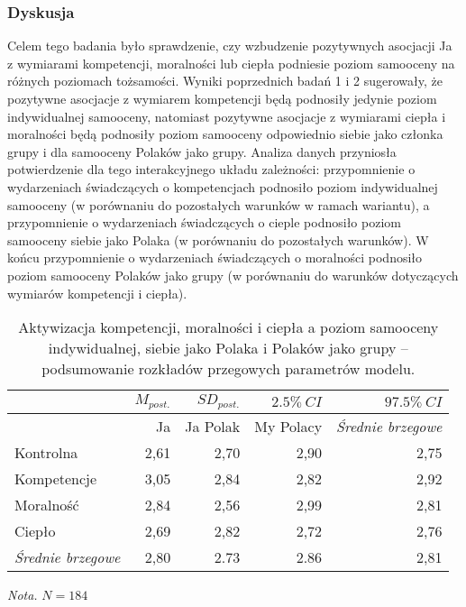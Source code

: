 \documentclass[man]{apa6}
\begin{document}
\subsubsection{Dyskusja}
Celem tego badania było sprawdzenie, czy wzbudzenie pozytywnych asocjacji Ja z wymiarami kompetencji, moralności lub ciepła podniesie poziom samooceny na różnych poziomach tożsamości. Wyniki poprzednich badań 1 i 2 sugerowały, że pozytywne asocjacje z wymiarem kompetencji będą podnosiły jedynie poziom indywidualnej samooceny, natomiast pozytywne asocjacje z wymiarami ciepła i moralności będą podnosiły poziom samooceny odpowiednio siebie jako członka grupy i dla samooceny Polaków jako grupy. Analiza danych przyniosła potwierdzenie dla tego interakcyjnego układu zależności: przypomnienie o wydarzeniach świadczących o kompetencjach podnosiło poziom indywidualnej samooceny (w porównaniu do pozostałych warunków w ramach wariantu), a przypomnienie o wydarzeniach świadczących o cieple podnosiło poziom samooceny siebie jako Polaka (w porównaniu do pozostałych warunków). W końcu przypomnienie o wydarzeniach świadczących o moralności podnosiło poziom samooceny Polaków jako grupy (w porównaniu do warunków dotyczących wymiarów kompetencji i ciepła). \\


\begin{table*}[htbp]
\vspace*{2em}
\centering
\begin{threeparttable}
\caption{Aktywizacja kompetencji, moralności i ciepła a poziom samooceny indywidualnej, siebie jako Polaka i Polaków jako grupy -- podsumowanie rozkładów przegowych parametrów modelu.}
\label{tab:3}
\bgroup
\def\arraystretch{0.85}
\begin{tabular}{lrrrr}

\midrule
 & $M_{post.}$    & $SD_{post.}$   & $2.5\%\ CI$ &  $97.5\%\ CI$  \\
\midrule

                        & Ja        & Ja Polak  & My Polacy & \emph{Średnie brzegowe}\\
Kontrolna               & 2,61      & 2,70      & 2,90      & 2,75 \\
Kompetencje             & 3,05      & 2,84      & 2,82      & 2,92 \\
Moralność               & 2,84      & 2,56      & 2,99      & 2,81 \\
Ciepło                  & 2,69      & 2,82      & 2,72      & 2,76 \\
\emph{Średnie brzegowe} & 2,80      & 2.73      & 2.86      & 2,81 \\

\bottomrule
\end{tabular}
\egroup
\begin{tablenotes}
{\small
\textit{Nota.} $N = 184$
}
\end{tablenotes}
\end{threeparttable}
\end{table*}
\end{document}
